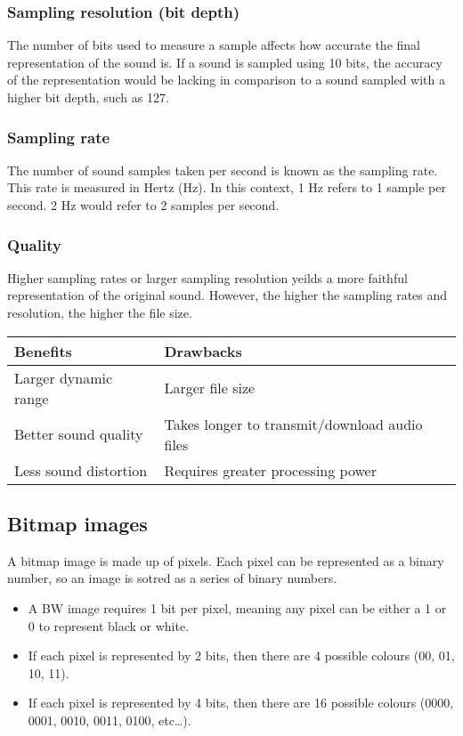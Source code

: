 \documentclass[11pt]{article}
\begin{document}
\subsubsection{Sampling resolution (bit depth)}
\label{sec:org96732f9}
The number of bits used to measure a sample affects how accurate the final representation of the sound is. If a sound is sampled using 10 bits, the accuracy of the representation would be lacking in comparison to a sound sampled with a higher bit depth, such as 127.
\subsubsection{Sampling rate}
\label{sec:org63c38b0}
The number of sound samples taken per second is known as the sampling rate. This rate is measured in Hertz (Hz). In this context, 1 Hz refers to 1 sample per second. 2 Hz would refer to 2 samples per second.
\subsubsection{Quality}
\label{sec:org368fe6b}
Higher sampling rates or larger sampling resolution yeilds a more faithful representation of the original sound. However, the higher the sampling rates and resolution, the higher the file size.
\begin{center}
\begin{tabular}{ll}
Benefits & Drawbacks\\
\hline
Larger dynamic range & Larger file size\\
Better sound quality & Takes longer to transmit/download audio files\\
Less sound distortion & Requires greater processing power\\
\end{tabular}
\end{center}
\subsection{Bitmap images}
\label{sec:orgca30d23}
A bitmap image is made up of pixels. Each pixel can be represented as a binary number, so an image is sotred as a series of binary numbers.
\begin{itemize}
\item A BW image requires 1 bit per pixel, meaning any pixel can be either a 1 or 0 to represent black or white.
\item If each pixel is represented by 2 bits, then there are 4 possible colours (00, 01, 10, 11).
\item If each pixel is represented by 4 bits, then there are 16 possible colours (0000, 0001, 0010, 0011, 0100, etc\ldots{}).
\end{itemize}
\end{document}
